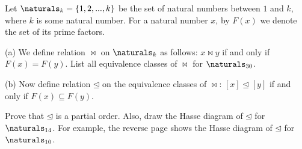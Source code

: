 \documentclass[11pt]{article}
\begin{document}

\medskip


\lineacross


\begin{problem}
Let $\naturals_k = \braced{1,2,...,k}$ be the set of natural numbers between
$1$ and $k$, where $k$ is some natural number.
For a natural number $x$, by $F(x)$ we denote the set of its prime
factors.

\medskip
\noindent
(a) We define relation $\bowtie$ on $\naturals_k$ as follows:
$x \bowtie y$ if and only if $F(x) = F(y)$.
List all equivalence classes of $\bowtie$ for $\naturals_{30}$.

\medskip
\noindent
(b)
Now define relation $\unlhd$ on the equivalence classes of
$\bowtie$:
$[x]\unlhd [y]$ if and only if $F(x) \subseteq F(y)$.

Prove that $\unlhd$ is a partial order.
Also, draw the Hasse diagram of $\unlhd$ for $\naturals_{14}$. For example,
the reverse page shows the Hasse diagram of $\unlhd$ for $\naturals_{10}$.

\medskip
\end{problem}

\end{document}

